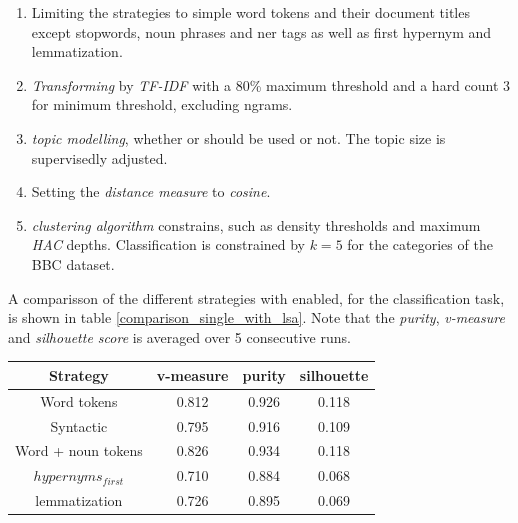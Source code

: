     \begin{enumerate}
      \item Limiting the strategies to simple word tokens and their document titles except stopwords, noun phrases and ner tags as well as \wordnet{} first hypernym and \wordnet{}lemmatization.

      \item \emph{Transforming} by \emph{TF-IDF} with a 80\% maximum threshold and a hard count $3$ for minimum threshold, excluding ngrams.

      \item \emph{topic modelling}, whether \lsa{} or \lda{} should be used or not. The topic size is supervisedly adjusted.

      \item Setting the \emph{distance measure} to \emph{cosine}.

      \item \emph{clustering algorithm} constrains, such as density thresholds and maximum \emph{HAC} depths. Classification is constrained by $k=5$ for the categories of the BBC dataset.
    \end{enumerate}

  A comparisson of the different strategies with \lsa{} enabled, for the classification task, is shown in table \ref{comparison_single_with_lsa}. Note that the \emph{purity}, \emph{v-measure} and \emph{silhouette score} is averaged over 5 consecutive runs.

    \begin{center}\label{comparison_single_with_lsa}
      \begin{tabular}{ c | c | c | c }
      Strategy    & v-measure & purity  & silhouette \\ \hline
      Word tokens & 0.812     & 0.926   & 0.118      \\
      Syntactic   & 0.795     & 0.916     & 0.109 \\
      Word + noun tokens & 0.826   & 0.934     & 0.118 \\
      \wordnet{} $hypernyms_{first}$ & 0.710   & 0.884     & 0.068 \\
      \wordnet{} lemmatization   & 0.726   & 0.895     & 0.069 \\
      \end{tabular}
    \end{center}

